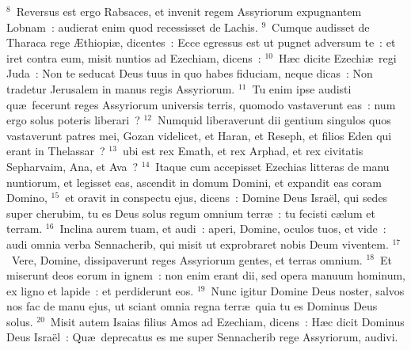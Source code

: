${}^{8}$~Reversus est ergo Rabsaces, et invenit regem Assyriorum expugnantem Lobnam~: audierat enim quod recessisset de Lachis.
${}^{9}$~Cumque audisset de Tharaca rege \AE thiopi\ae , dicentes~: Ecce egressus est ut pugnet adversum te~: et iret contra eum, misit nuntios ad Ezechiam, dicens~:
${}^{10}$~H\ae c dicite Ezechi\ae\ regi Juda~: Non te seducat Deus tuus in quo habes fiduciam, neque dicas~: Non tradetur Jerusalem in manus regis Assyriorum.
${}^{11}$~Tu enim ipse audisti qu\ae\ fecerunt reges Assyriorum universis terris, quomodo vastaverunt eas~: num ergo solus poteris liberari~?
${}^{12}$~Numquid liberaverunt dii gentium singulos quos vastaverunt patres mei, Gozan videlicet, et Haran, et Reseph, et filios Eden qui erant in Thelassar~?
${}^{13}$~ubi est rex Emath, et rex Arphad, et rex civitatis Sepharvaim, Ana, et Ava~?
${}^{14}$~Itaque cum accepisset Ezechias litteras de manu nuntiorum, et legisset eas, ascendit in domum Domini, et expandit eas coram Domino,
${}^{15}$~et oravit in conspectu ejus, dicens~: Domine Deus Isra\"el, qui sedes super cherubim, tu es Deus solus regum omnium terr\ae~: tu fecisti c\ae lum et terram.
${}^{16}$~Inclina aurem tuam, et audi~: aperi, Domine, oculos tuos, et vide~: audi omnia verba Sennacherib, qui misit ut exprobraret nobis Deum viventem.
${}^{17}$~Vere, Domine, dissipaverunt reges Assyriorum gentes, et terras omnium.
${}^{18}$~Et miserunt deos eorum in ignem~: non enim erant dii, sed opera manuum hominum, ex ligno et lapide~: et perdiderunt eos.
${}^{19}$~Nunc igitur Domine Deus noster, salvos nos fac de manu ejus, ut sciant omnia regna terr\ae\ quia tu es Dominus Deus solus.
${}^{20}$~Misit autem Isaias filius Amos ad Ezechiam, dicens~: H\ae c dicit Dominus Deus Isra\"el~: Qu\ae\ deprecatus es me super Sennacherib rege Assyriorum, audivi.


